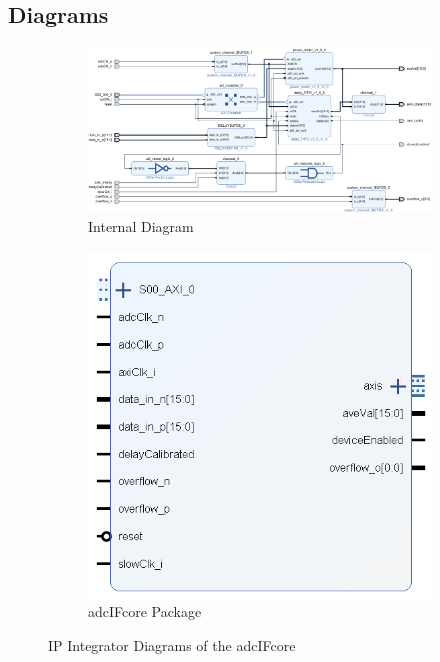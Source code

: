 \documentclass[11pt]{article}
\begin{document}
\subsection{Diagrams}
\begin{figure}[H]
	\centering
	\begin{subfigure}[b]{\linewidth}
		\includegraphics[width=\linewidth]{images/adc_IF_core_internal}
		\caption{Internal Diagram}
	\end{subfigure}
	\begin{subfigure}[b]{0.4\linewidth}
		\includegraphics[width=\linewidth]{images/adc_IF_core}
		\caption{adc\textunderscore IF\textunderscore core Package}
	\end{subfigure}
	\caption{IP Integrator Diagrams of the adc\textunderscore IF\textunderscore core}
\end{figure}
\end{document}
